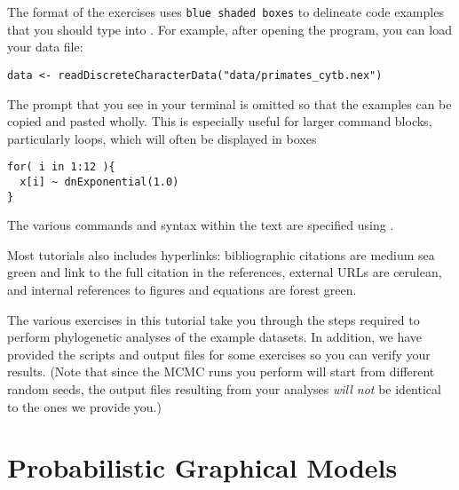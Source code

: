 The format of the exercises uses \colorbox{shadecolor}{\tt blue shaded boxes} to delineate code examples that you should type into \RevBayes. 
For example, after opening the \RevBayes program, you can load your data file:
{\tt \begin{snugshade*}
\begin{lstlisting}
data <- readDiscreteCharacterData("data/primates_cytb.nex")
\end{lstlisting}
\end{snugshade*}}

The  prompt that you see in your terminal is omitted so that the examples can be copied and pasted wholly. 
This is especially useful for larger command blocks, particularly loops, which will often be displayed in boxes
{\tt \begin{snugshade*}
\begin{lstlisting}
for( i in 1:12 ){
  x[i] ~ dnExponential(1.0)
}
\end{lstlisting}
\end{snugshade*}}

The various \RevBayes commands and syntax within the text are specified using . 

Most tutorials also includes hyperlinks: bibliographic citations are {\textcolor{citescol}{medium sea green}} and link to the full citation in the references, external URLs are {\textcolor{urlscol}{cerulean}}, and internal references to figures and equations are {\textcolor{linkscol}{forest green}}.

The various exercises in this tutorial take you through the steps required to perform phylogenetic analyses of the example datasets. 
In addition, we have provided the \Rev scripts and output files for some exercises so you can verify your results.
(Note that since the MCMC runs you perform will start from different random seeds, the output files resulting from your analyses \textit{will not} be identical to the ones we provide you.)


\bigskip
\section{Probabilistic Graphical Models}

